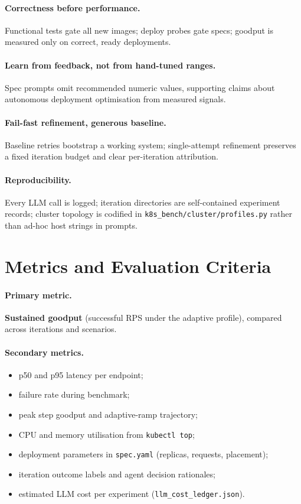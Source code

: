 \paragraph{Correctness before performance.}
Functional tests gate all new images; deploy probes gate specs; goodput is
measured only on correct, ready deployments.

\paragraph{Learn from feedback, not from hand-tuned ranges.}
Spec prompts omit recommended numeric values, supporting claims about autonomous
deployment optimisation from measured signals.

\paragraph{Fail-fast refinement, generous baseline.}
Baseline retries bootstrap a working system; single-attempt refinement preserves
a fixed iteration budget and clear per-iteration attribution.

\paragraph{Reproducibility.}
Every LLM call is logged; iteration directories are self-contained experiment
records; cluster topology is codified in \texttt{k8s\_bench/cluster/profiles.py}
rather than ad-hoc host strings in prompts.


\section{Metrics and Evaluation Criteria}
\label{sec:methods-metrics}

\paragraph{Primary metric.}
\textbf{Sustained goodput} (successful RPS under the adaptive profile), compared
across iterations and scenarios.

\paragraph{Secondary metrics.}
\begin{itemize}
  \item p50 and p95 latency per endpoint;
  \item failure rate during benchmark;
  \item peak step goodput and adaptive-ramp trajectory;
  \item CPU and memory utilisation from \texttt{kubectl top};
  \item deployment parameters in \texttt{spec.yaml} (replicas, requests, placement);
  \item iteration outcome labels and agent decision rationales;
  \item estimated LLM cost per experiment (\texttt{llm\_cost\_ledger.json}).
\end{itemize}

